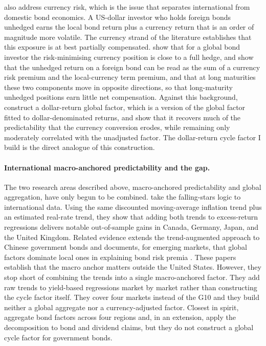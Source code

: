 \citet{dahlquist2013} also address currency risk, which is the issue that
separates international from domestic bond economics. A US-dollar
investor who holds foreign bonds unhedged earns the local bond return
plus a currency return that is an order of magnitude more volatile. The
currency strand of the literature establishes that this exposure is at
best partially compensated. \citet{campbellviceira2010} show that for a
global bond investor the risk-minimising currency position is close to a
full hedge, and \citet{lustig2019} show that the unhedged return on a foreign
bond can be read as the sum of a currency risk premium and the local-currency
term premium, and that at long maturities these two components move in opposite
directions, so that long-maturity unhedged positions earn little net
compensation.
Against this background, \citet{dahlquist2013} construct a
dollar-return global factor, which is a version of the global factor
fitted to dollar-denominated returns, and show that it recovers much of
the predictability that the currency conversion erodes, while remaining
only moderately correlated with the unadjusted factor. The dollar-return
cycle factor I build is the direct analogue of this construction.

\paragraph{International macro-anchored predictability and the gap.}
\label{sec:lit-gap}

The two research areas described above, macro-anchored
predictability and global aggregation, have only begun to be combined.
\citet{zhang2021} take the falling-stars logic to international data.
Using the same discounted moving-average inflation trend plus an estimated real-rate trend, they show that adding
both trends to excess-return regressions delivers notable
out-of-sample gains in Canada, Germany, Japan, and the United Kingdom.
Related evidence extends the trend-augmented approach to Chinese
government bonds \citep{zhang2022} and documents, for emerging markets, that
global factors dominate local ones in explaining bond risk premia
\citep{iania2021}. These papers establish that the macro
anchor matters outside the United States. However, they stop short of
combining the trends into a single macro-anchored factor. They add raw
trends to yield-based
regressions market by market rather than constructing the cycle factor
itself. They cover four markets instead of the G10 and they build
neither a global aggregate nor a currency-adjusted factor. Closest in
spirit, \citet{cejnek2020} aggregate \citet{cochrane2005} bond factors
across four regions and, in an extension, apply the \citet{cieslak2015}
decomposition to bond and dividend claims, but they do not construct a
global cycle factor for government bonds.

